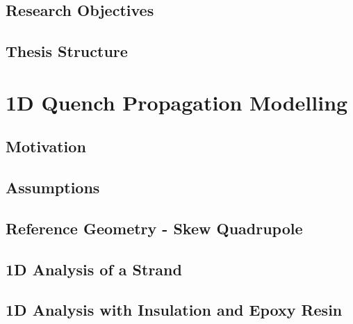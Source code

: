 \documentclass[11pt,a4paper]{report}
\begin{document}
\section{Research Objectives}


\section{Thesis Structure}


\clearpage
\chapter{1D Quench Propagation Modelling}
\label{chapter: 1d_quench_propagation_modelling}

\section{Motivation}
\label{section: 1d_quench_propagation_motivation}


\section{Assumptions}
\label{section: 1d_quench_propagation_assumptions}


\section{Reference Geometry - Skew Quadrupole}
\label{section: 1d_quench_propagation_geometry}


\section{1D Analysis of a Strand}

\label{section: 1D_quench_propagation_no_insulation}


\section{1D Analysis with Insulation and Epoxy Resin}

\label{section: 1D_quench_propagation_with_insulation}

\end{document}
